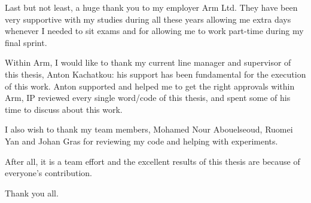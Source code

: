 \medskip

Last but not least, a huge thank you to my employer Arm Ltd. They have been
very supportive with my studies during all these years allowing me extra days
whenever I needed to sit exams and for allowing me to work part-time during my
final sprint.

Within Arm, I would like to thank my current line manager and supervisor of
this thesis, Anton Kachatkou: his support has been fundamental for the
execution of this work. Anton supported and helped me to get the right
approvals within Arm, IP reviewed every single word/code of this thesis, and
spent some of his time to discuss about this work.

I also wish to thank my team members, Mohamed Nour Abouelseoud, Ruomei Yan and
Johan Gras for reviewing my code and helping with experiments.

After all, it is a team effort and the excellent results of this thesis are
because of everyone's contribution.

\medskip

Thank you all.

\clearpage

